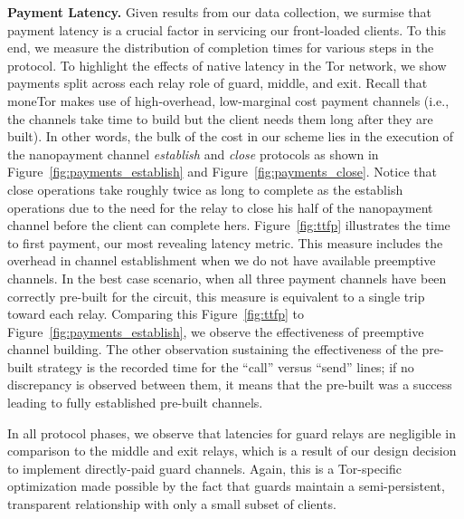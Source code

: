 \medskip \noindent \textbf{Payment Latency.}
Given results from our data collection, we surmise that payment latency is a crucial factor in servicing our front-loaded clients.
To this end, we measure the distribution of completion times for various steps in the protocol.
To highlight the effects of native latency in the Tor network, we show payments split across each relay role of guard, middle, and exit.
Recall that moneTor makes use of high-overhead, low-marginal cost payment channels (i.e., the channels take time to build but the client needs them long after they are built).
In other words, the bulk of the cost in our scheme lies in the execution of the nanopayment channel \emph{establish} and \emph{close} protocols as shown in Figure~\ref{fig:payments_establish} and Figure~\ref{fig:payments_close}.
Notice that close operations take roughly twice as long to complete as the establish operations due to the need for the relay to close his half of the nanopayment channel before the client can complete hers.
Figure~\ref{fig:ttfp} illustrates the time to first payment, our most revealing latency metric.
This measure includes the overhead in channel establishment when we do not have available preemptive channels.
In the best case scenario, when all three payment channels have been correctly pre-built for the circuit, this measure is equivalent to a single trip toward each relay.
Comparing this Figure~\ref{fig:ttfp} to Figure~\ref{fig:payments_establish}, we observe the effectiveness of preemptive channel building.
The other observation sustaining the effectiveness of the pre-built strategy is the recorded time for the ``call'' versus ``send'' lines; if no discrepancy is observed between them, it means that the pre-built was a success leading to fully established pre-built channels.

In all protocol phases, we observe that latencies for guard relays are negligible in comparison to the middle and exit relays, which is a result of our design decision to implement directly-paid guard channels.
Again, this is a Tor-specific optimization made possible by the fact that guards maintain a semi-persistent, transparent relationship with only a small subset of clients.

